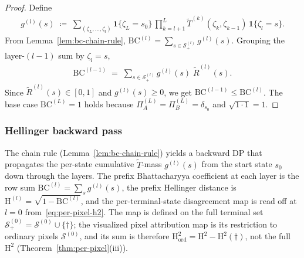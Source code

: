 \documentclass[twoside]{article}
\newcommand{\1}{\mathbf{1}}
\begin{document}
\begin{proof}
Define
\begin{align}
    g^{(l)}(s) \;\coloneqq\; \sum_{(\zeta_L,\ldots,\zeta_l)} \mathbf{1}\{\zeta_L = s_0\}\,
    \prod_{k=l+1}^L \widetilde{T}^{(k)}(\zeta_k, \zeta_{k-1})\, \mathbf{1}\{\zeta_l = s\}.
\end{align}
From Lemma~\ref{lem:bc-chain-rule}, $\mathrm{BC}^{(l)} = \sum_{s \in \mathcal{S}^{(l)}_+}
    g^{(l)}(s)$.  Grouping the layer-$(l-1)$ sum by $\zeta_l = s$,
\begin{align}
    \mathrm{BC}^{(l-1)} \;=\; \sum_{s \in \mathcal{S}^{(l)}_+} g^{(l)}(s)\; \widetilde{R}^{(l)}(s).
\end{align}
Since $\widetilde{R}^{(l)}(s) \in [0, 1]$ and $g^{(l)}(s) \geq 0$, we get $\mathrm{BC}^{(l-1)} \leq
    \mathrm{BC}^{(l)}$.  The base case $\mathrm{BC}^{(L)} = 1$ holds because $\Pi^{(L)}_A = \Pi^{(L)}_B
    = \delta_{s_0}$ and $\sqrt{1 \cdot 1} = 1$.
\end{proof}

\subsubsection{Hellinger backward pass}\label{sec:lmp-hellinger-backward}

The chain rule (Lemma~\ref{lem:bc-chain-rule}) yields a backward DP that propagates the per-state
cumulative $\widetilde{T}$-mass $g^{(l)}(s)$ from the start state $s_0$ down through the layers.
The prefix Bhattacharyya coefficient at each layer is the row sum $\mathrm{BC}^{(l)} = \sum_{s}
    g^{(l)}(s)$, the prefix Hellinger distance is $\mathrm{H}^{(l)} = \sqrt{1 - \mathrm{BC}^{(l)}}$,
and the per-terminal-state disagreement map is read off at $l = 0$ from~\eqref{eq:per-pixel-h2}.
The map is defined on the full terminal set $\mathcal{S}^{(0)}_+ = \mathcal{S}^{(0)} \cup
    \{\dagger\}$; the visualized pixel attribution map is its restriction to ordinary pixels
$\mathcal{S}^{(0)}$, and its sum is therefore $\mathrm{H}^2_{\mathrm{ord}} = \mathrm{H}^2 -
    \mathrm{H}^2(\dagger)$, not the full $\mathrm{H}^2$ (Theorem~\ref{thm:per-pixel}(iii)).
\end{document}
